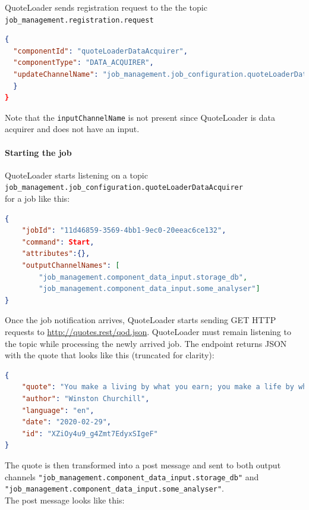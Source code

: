 QuoteLoader sends registration request to the the topic\newline %
\texttt{job\_management.registration.request}

\begin{lstlisting}[language=json,firstnumber=1]
{
  "componentId": "quoteLoaderDataAcquirer",
  "componentType": "DATA_ACQUIRER",
  "updateChannelName": "job_management.job_configuration.quoteLoaderDataAcquirer"
  }
}
\end{lstlisting}

Note that the \texttt{inputChannelName} is not present since QuoteLoader is data acquirer and does not have an input.

\paragraph{Starting the job}

QuoteLoader starts listening on a topic \newline
\texttt{job\_management.job\_configuration.quoteLoaderDataAcquirer}
 \\for a job like this:

\begin{lstlisting}[language=json,firstnumber=1]
{
    "jobId": "11d46859-3569-4bb1-9ec0-20eeac6ce132",
    "command": Start,
    "attributes":{},
    "outputChannelNames": [
        "job_management.component_data_input.storage_db",
        "job_management.component_data_input.some_analyser"]
}
\end{lstlisting}

Once the job notification arrives, QuoteLoader starts sending GET HTTP requests to \url{http://quotes.rest/qod.json}. QuoteLoader must remain listening to the topic while processing the newly arrived job. The endpoint returns JSON with the quote that looks like this (truncated for clarity):

\begin{lstlisting}[language=json,firstnumber=1]
{
    "quote": "You make a living by what you earn; you make a life by what you give.",
    "author": "Winston Churchill",
    "language": "en",
    "date": "2020-02-29",
    "id": "XZiOy4u9_g4Zmt7EdyxSIgeF"
}
\end{lstlisting}

The quote is then transformed into a post message and sent to both output channels \texttt{"job\_management.component\_data\_input.storage\_db"} and\newline \texttt{       "job\_management.component\_data\_input.some\_analyser"}.\\The post message looks like this:

